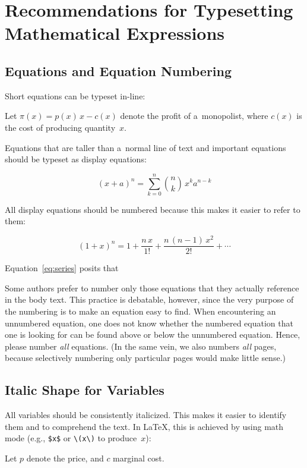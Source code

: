 \documentclass[12pt, a4paper, oneside]{article}
\theoremstyle{Plain}
\theoremstyle{Definition}
\theoremstyle{Remark}
\begin{document}
\section{Recommendations for Typesetting Mathematical Expressions}
\label{sec:math}

\subsection{Equations and Equation Numbering}
Short equations can be typeset in-line:
\begin{tcolorbox}
	Let $\pi(x) = p(x)\,x - c(x)$ denote the profit of a~monopolist, where $c(x)$ is the cost of producing quantity~$x$.
\end{tcolorbox}

Equations that are taller than a~normal line of text and important equations should be typeset as display equations:
\begin{tcolorbox}[bottom = -2.75ex, top = -2.75ex]
	\begin{equation}
		(x+a)^n= \sum_{k=0}^n \binom{n}{k} \, x^k a^{n-k}
	\end{equation}%
\end{tcolorbox}

All display equations should be numbered because this makes it easier to refer to them:
\begin{tcolorbox}[top = -2.75ex]
	\begin{equation}
		\label{eq:series}
		(1+x)^n = 1 + \frac{n\,x}{1!} + \frac{n\,(n-1)\,x^2}{2!} + \cdots
	\end{equation} \par
	Equation~\eqref{eq:series} posits that \textellipsis
\end{tcolorbox}
Some authors prefer to number only those equations that they actually reference in the body text. This practice is debatable, however, since the very purpose of the numbering is to make an equation easy to find. When encountering an unnumbered equation, one does not know whether the numbered equation that one is looking for can be found above or below the unnumbered equation. Hence, please number \emph{all} equations. (In the same vein, we also numbers \emph{all} pages, because selectively numbering only particular pages would make little sense.)

\subsection{Italic Shape for Variables}
All variables should be consistently italicized. This makes it easier to identify them and to com\-pre\-hend the text. In LaTeX, this is achieved by using math mode (e.g., \verb|$x$| or \verb|\(x\)| to produce~$x$):
\begin{tcolorbox}
	Let $p$ denote the price, and $c$ marginal cost.
\end{tcolorbox}
\end{document}
